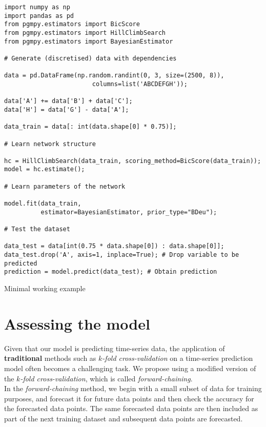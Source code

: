 \begin{listing}[ht]
\begin{verbatim}
import numpy as np
import pandas as pd
from pgmpy.estimators import BicScore
from pgmpy.estimators import HillClimbSearch
from pgmpy.estimators import BayesianEstimator

# Generate (discretised) data with dependencies

data = pd.DataFrame(np.random.randint(0, 3, size=(2500, 8)),
                        columns=list('ABCDEFGH'));

data['A'] += data['B'] + data['C'];
data['H'] = data['G'] - data['A'];

data_train = data[: int(data.shape[0] * 0.75)];

# Learn network structure

hc = HillClimbSearch(data_train, scoring_method=BicScore(data_train));
model = hc.estimate();

# Learn parameters of the network

model.fit(data_train,
          estimator=BayesianEstimator, prior_type="BDeu");

# Test the dataset

data_test = data[int(0.75 * data.shape[0]) : data.shape[0]]; 
data_test.drop('A', axis=1, inplace=True); # Drop variable to be predicted
prediction = model.predict(data_test); # Obtain prediction
\end{verbatim}
\caption{Minimal working example}
\label{listing:1}
\end{listing}

\section{Assessing the model}

Given that our model is predicting time-series data, the application of \textbf{traditional} methods such as \textit{$k$-fold cross-validation} on a time-series prediction model often becomes a challenging task. We propose using a modified version of the \textit{$k$-fold cross-validation}, which is called \textit{forward-chaining}\citep{14109}. \\

In the \textit{forward-chaining} method, we begin with a small subset of data for training purposes, and forecast it for future data points and then check the accuracy for the forecasted data points. The same forecasted data points are then included as part of the next training dataset and subsequent data points are forecasted. \\

